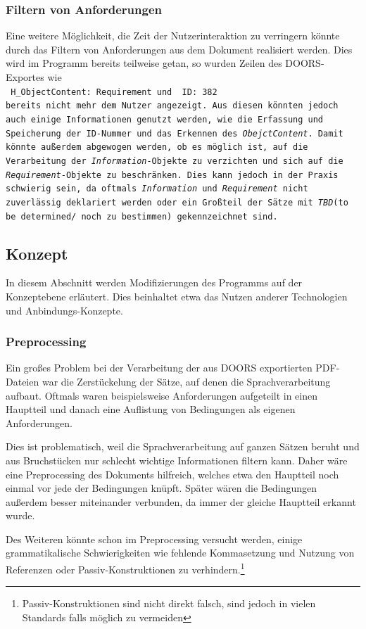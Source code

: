 \documentclass[12pt]{report}
\begin{document}
\subsubsection{Filtern von Anforderungen}
Eine weitere Möglichkeit, die Zeit der Nutzerinteraktion zu verringern könnte durch das Filtern von Anforderungen aus dem Dokument realisiert werden. Dies wird im Programm bereits teilweise getan, so wurden Zeilen des DOORS-Exportes wie\\
\tt
H\_ObjectContent: Requirement
\rm 
und 
\tt
ID: 382
\rm\\
bereits nicht mehr dem Nutzer angezeigt. Aus diesen könnten jedoch auch einige Informationen genutzt werden, wie die Erfassung und Speicherung der ID-Nummer und das Erkennen des \textit{ObejctContent}. Damit könnte außerdem abgewogen werden, ob es möglich ist, auf die Verarbeitung der \textit{Information}-Objekte zu verzichten und sich auf die \textit{Requirement}-Objekte zu beschränken. Dies kann jedoch in der Praxis schwierig sein, da oftmals \textit{Information} und \textit{Requirement} nicht zuverlässig deklariert werden oder ein Großteil der Sätze mit \textit{TBD}(to be determined/ noch zu bestimmen) gekennzeichnet sind.
\subsection{Konzept}
In diesem Abschnitt werden Modifizierungen des Programms auf der Konzeptebene erläutert. Dies beinhaltet etwa das Nutzen anderer Technologien und Anbindungs-Konzepte. 
\subsubsection{Preprocessing}
Ein großes Problem bei der Verarbeitung der aus DOORS exportierten PDF-Dateien war die Zerstückelung der Sätze, auf denen die Sprachverarbeitung aufbaut. Oftmals waren beispielsweise Anforderungen aufgeteilt in einen Hauptteil und danach eine Auflistung von Bedingungen als eigenen Anforderungen.

Dies ist problematisch, weil die Sprachverarbeitung auf ganzen Sätzen beruht und aus Bruchstücken nur schlecht wichtige Informationen filtern kann. Daher wäre eine Preprocessing des Dokuments hilfreich, welches etwa den Hauptteil noch einmal vor jede der Bedingungen knüpft. Später wären die Bedingungen außerdem besser miteinander verbunden, da immer der gleiche Hauptteil erkannt wurde.

Des Weiteren könnte schon im Preprocessing versucht werden, einige grammatikalische Schwierigkeiten wie fehlende Kommasetzung und Nutzung von Referenzen oder Passiv-Konstruktionen zu verhindern.\footnote{Passiv-Konstruktionen sind nicht direkt falsch, sind jedoch in vielen Standards falls möglich zu vermeiden}
\end{document}
